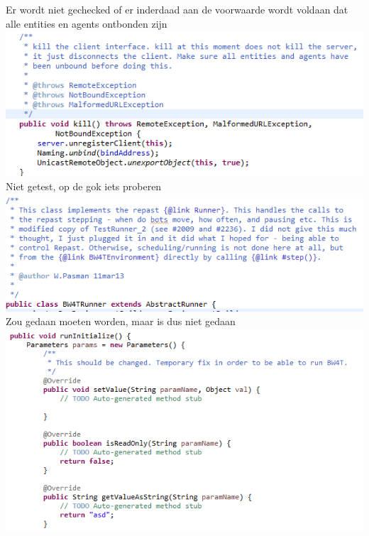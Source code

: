 \documentclass[11pt,a4paper]{article}
\begin{document}
Er wordt niet gechecked of er inderdaad aan de voorwaarde wordt voldaan dat alle entities en agents ontbonden zijn\\
\includegraphics[width=\linewidth]{noEntityCheck.png} \\ 

Niet getest, op de gok iets proberen \\
\includegraphics[width=\linewidth]{notTested.png} \\ 

Zou gedaan moeten worden, maar is dus niet gedaan \\
\includegraphics[width=\linewidth]{TODOs+shouldBeFixed} \\
\end{document}
